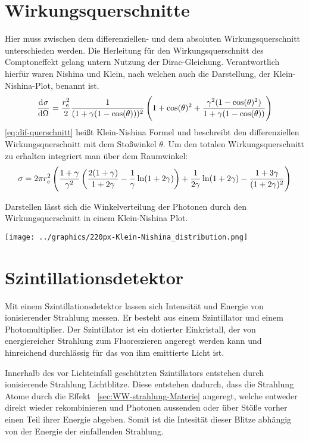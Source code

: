 \documentclass[11pt, ngerman, fleqn, DIV=15, headinclude, BCOR=2cm]{scrreprt}
\begin{document}
\section{Wirkungsquerschnitte}
Hier muss zwischen dem differenziellen- und dem absoluten Wirkungsquerschnitt
unterschieden werden.
Die Herleitung für den Wirkungsquerschnitt des Comptoneffekt gelang untern
Nutzung der Dirac-Gleichung. Verantwortlich hierfür waren Nishina und
Klein, nach welchen auch die Darstellung, der Klein-Nishina-Plot, benannt ist.
\[
    \dod \sigma\Omega = \frac{r^2_\text{e}}{2}
    \frac{1}{(1+\gamma(1-\cos(\theta)))^2}\del{1+\cos(\theta)^2+\frac{\gamma^2(1-\cos(\theta)^2)}{1+\gamma(1-\cos(\theta))}}
\]
\label{eq:dif-querschnitt}
\ref{eq:dif-querschnitt} heißt Klein-Nishina Formel und beschreibt den
differenziellen Wirkungsquerschnitt mit dem Stoßwinkel $\theta$.
Um den totalen Wirkungsquerschnitt zu erhalten integriert man über dem
Raumwinkel:
\[
    \sigma = 2\pi r^2_e
    \del{\frac{1+\gamma}{\gamma^2}\del{\frac{2(1+\gamma)}{1+2\gamma}-\frac
        1\gamma\ln(1+2\gamma)}+\frac
    1{2\gamma}\ln(1+2\gamma)-\frac{1+3\gamma}{(1+2\gamma)^2}}
\]

Darstellen lässt sich die Winkelverteilung der Photonen durch den Wirkungsquerschnitt in einem
Klein-Nishina Plot. 

\texttt{[image: ../graphics/220px-Klein-Nishina\_distribution.png]}

\section{Szintillationsdetektor}
Mit einem Szintillationsdetektor lassen sich Intensität und Energie von
ionisierender Strahlung messen.
Er besteht aus einem Szintillator und einem Photomultiplier.
Der Szintillator ist ein dotierter Einkristall, der von energiereicher
Strahlung zum Fluoreszieren angeregt werden kann und hinreichend
durchlässig für das von ihm emittierte Licht ist.

Innerhalb des vor Lichteinfall geschützten Szintillators entstehen durch
ionisierende Strahlung Lichtblitze. 
Diese entstehen dadurch, dass die Strahlung Atome durch die Effekt
~\ref{sec:WW-strahlung-Materie} angeregt, welche entweder direkt
wieder rekombinieren und Photonen aussenden oder über Stöße vorher einen Teil
ihrer Energie abgeben.
Somit ist die Intesität dieser Blitze abhängig von der Energie der einfallenden Strahlung.
\end{document}
